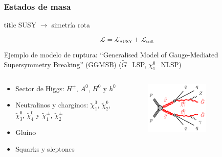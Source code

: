 \documentclass[10pt, compress,spanish]{beamer}
\begin{document}
\begin{frame}[fragile]

\frametitle{Estados de masa}

  \begin{beamercolorbox}[leftskip=\titlelf]{title}
    \centering{}\normalsize SUSY $\longrightarrow$ simetría rota
  \end{beamercolorbox}


\begin{equation*}
\mathcal{L}=\mathcal{L}_{\text{SUSY}}+\mathcal{L}_{\text{soft}}
\end{equation*}

\normalsize

\vspace{0.5cm}

Ejemplo de modelo de ruptura: “Generalised Model of Gauge-Mediated Supersymmetry Breaking” (GGMSB) 
{\footnotesize ($\tilde{G}$=LSP, $\chi_{1}^{0}$=NLSP)}

\vspace{0.5cm}

\begin{columns}

\begin{column}{0.5\textwidth}
\begin{itemize}

  \item Sector de Higgs: $H^{\pm}$,  $A^{0}$,  $H^{0}$ y $h^{0}$

  \item Neutralinos y charginos: $\widetilde{\chi}^{0}_{1}$, $\widetilde{\chi}^{0}_{2}$, $\widetilde{\chi}^{0}_{3}$, $\widetilde{\chi}^{0}_{4}$ y $\widetilde{\chi}^{\pm}_{1}$, $\widetilde{\chi}^{\pm}_{2}$

  \item Gluino

  \item Squarks y sleptones


\end{itemize}
\end{column}

\begin{column}{0.5\textwidth}



\begin{figure}
\centering
\includegraphics[width=0.7\textwidth]{gogo-qqqqphZGG-GMSB.pdf}
\end{figure}



\end{column}
\end{columns}
\end{frame}
\end{document}
